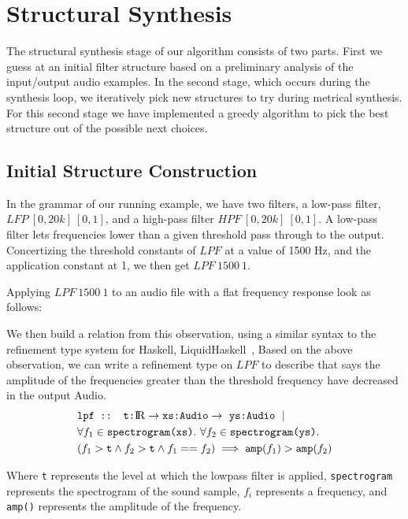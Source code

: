 \section{Structural Synthesis}
\label{sec:struct}

The structural synthesis stage of our algorithm consists of two parts.
First we guess at an initial filter structure based on a preliminary analysis of the input/output audio examples.
In the second stage, which occurs during the synthesis loop, we iteratively pick new structures to try during metrical synthesis.
For this second stage we have implemented a greedy algorithm to pick the best structure out of the possible next choices.

\subsection{Initial Structure Construction}
In the grammar of our running example, we have two filters, a low-pass filter, $LFP \ [0,20k]\ [0,1]$, and a high-pass filter $HPF\ [0,20k]\ [0,1]$.
A low-pass filter lets frequencies lower than a given threshold pass through to the output.
Concertizing the threshold constants of $LPF$ at a value of 1500 Hz, and the application constant at 1, we then get $LPF \ 1500 \ 1$.

Applying $LPF \ 1500 \ 1$ to an audio file with a flat frequency response look as follows:


We then build a relation from this observation, using a similar syntax to the refinement type system for Haskell, LiquidHaskell~\cite{vazou2014refinement}, 
Based on the above observation, we can write a refinement type on $LPF$ to describe that says the amplitude of the frequencies greater than the threshold frequency have decreased in the output Audio.
%
\begin{align*}
  &\texttt{lpf :: t:\reals} \to  \texttt{xs:Audio} \to\ \texttt{ys:Audio}\ \mid \\
  &\forall f_1 \in  \texttt{spectrogram(xs)}.\ \forall f_2 \in \texttt{spectrogram(ys)}. \\
  &(f_1 > \texttt{t}  \land  f_2 > \texttt{t}  \land f_1 == f_2) \implies \texttt{amp}(f_1) > \texttt{amp}(f_2)
\end{align*}

Where \texttt{t} represents the level at which the lowpass filter is applied, \texttt{spectrogram} represents the spectrogram of the sound sample, $f_i$ represents a frequency, and \texttt{amp()} represents the amplitude of the frequency. 

